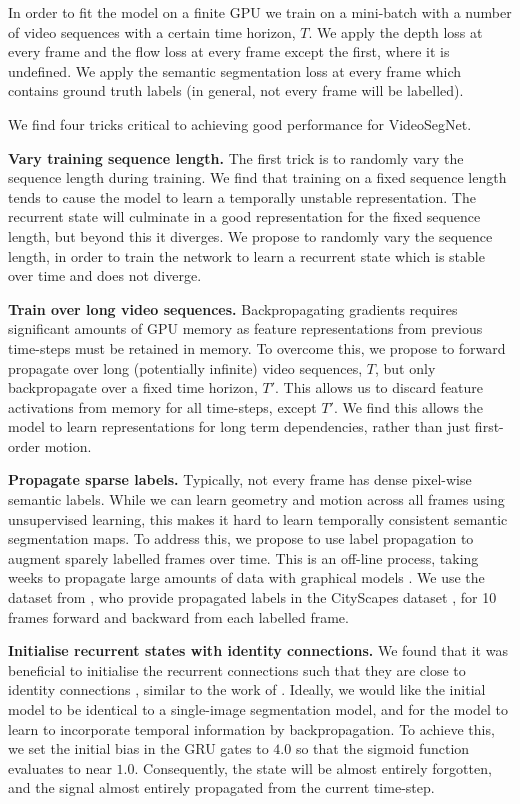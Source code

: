 In order to fit the model on a finite GPU we train on a mini-batch with a number of video sequences with a certain time horizon, $T$. We apply the depth loss at every frame and the flow loss at every frame except the first, where it is undefined. We apply the semantic segmentation loss at every frame which contains ground truth labels (in general, not every frame will be labelled).

We find four tricks critical to achieving good performance for VideoSegNet.

\textbf{Vary training sequence length.} The first trick is to randomly vary the sequence length during training. We find that training on a fixed sequence length tends to cause the model to learn a temporally unstable representation. The recurrent state will culminate in a good representation for the fixed sequence length, but beyond this it diverges. We propose to randomly vary the sequence length, in order to train the network to learn a recurrent state which is stable over time and does not diverge.

\textbf{Train over long video sequences.} Backpropagating gradients requires significant amounts of GPU memory as feature representations from previous time-steps must be retained in memory. To overcome this, we propose to forward propagate over long (potentially infinite) video sequences, $T$, but only backpropagate over a fixed time horizon, $T'$. This allows us to discard feature activations from memory for all time-steps, except $T'$. We find this allows the model to learn representations for long term dependencies, rather than just first-order motion.

\textbf{Propagate sparse labels.} Typically, not every frame has dense pixel-wise semantic labels. While we can learn geometry and motion across all frames using unsupervised learning, this makes it hard to learn temporally consistent semantic segmentation maps. To address this, we propose to use label propagation \citep{budvytis2010label} to augment sparely labelled frames over time. This is an off-line process, taking weeks to propagate large amounts of data with graphical models \citep{budvytis2010label}. We use the dataset from \citep{budvytis2017large}, who provide propagated labels in the CityScapes dataset \citep{Cordts2016Cityscapes}, for 10 frames forward and backward from each labelled frame.

\textbf{Initialise recurrent states with identity connections.} We found that it was beneficial to initialise the recurrent connections such that they are close to identity connections \citep{he2016deep}, similar to the work of \citep{gadde2017semantic}. Ideally, we would like the initial model to be identical to a single-image segmentation model, and for the model to learn to incorporate temporal information by backpropagation. To achieve this, we set the initial bias in the GRU gates to $4.0$ so that the sigmoid function evaluates to near $1.0$. Consequently, the state will be almost entirely forgotten, and the signal almost entirely propagated from the current time-step.

